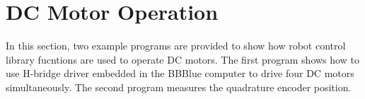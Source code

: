 \section{DC Motor Operation}
\label{sec:appDC-MotorOperation}
In this section, two example programs are provided to show how robot control library fucntions are used to operate DC motors. The first program shows how to use H-bridge driver embedded in the BBBlue computer to drive four DC motors simultaneously. The second program measures the  quadrature encoder position.


\begin{mdframed}[backgroundcolor=yellow!5,roundcorner=7pt,outerlinecolor=blue!70!black,outerlinewidth=1.2,frametitle=A sample program that drives four DC motors using PWM signal.]

    \inputminted[breaklines,linenos]{C}{../librobotcontrol-master/examples/src/rc_test_motors.c}

  \end{mdframed}

\begin{mdframed}[backgroundcolor=yellow!5,roundcorner=7pt,outerlinecolor=blue!70!black,outerlinewidth=1.2,frametitle=A sample program that reads quadrature encoder values to measure position of rotary encoder.]
    \inputminted[breaklines,linenos]{C}{../librobotcontrol-master/examples/src/rc_test_encoders.c}

  \end{mdframed}
  


